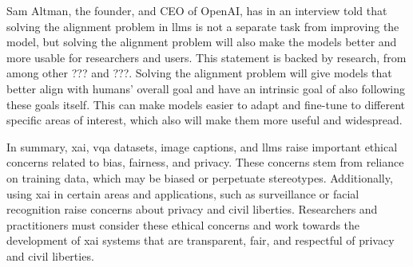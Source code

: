 

Sam Altman, the founder, and CEO of OpenAI, has in an interview told that solving the alignment problem in \glspl{llm} is not a separate task from improving the model, but solving the alignment problem will also make the models better and more usable for researchers and users. This statement is backed by research, from among other ??? and ???. Solving the alignment problem will give models that better align with humans' overall goal and have an intrinsic goal of also following these goals itself. This can make models easier to adapt and fine-tune to different specific areas of interest, which also will make them more useful and widespread. 










\begin{comment}
    Tell how this thesis uses the ethical information above when doing research.
\end{comment}

In summary, \gls{xai}, \gls{vqa} datasets, image captions, and \glspl{llm} raise important ethical concerns related to bias, fairness, and privacy. These concerns stem from reliance on training data, which may be biased or perpetuate stereotypes. Additionally, using \gls{xai} in certain areas and applications, such as surveillance or facial recognition raise concerns about privacy and civil liberties. Researchers and practitioners must consider these ethical concerns and work towards the development of \gls{xai} systems that are transparent, fair, and respectful of privacy and civil liberties.